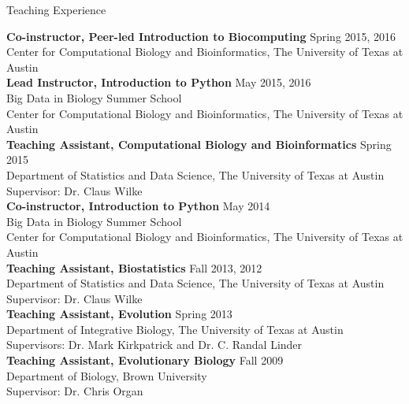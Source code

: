 \documentclass{resume} %
\begin{document}

\vspace*{0.5cm}
\begin{rSection}{Teaching Experience}
\vspace*{0.25cm}


\textbf{Co-instructor, Peer-led Introduction to Biocomputing} \hfill Spring 2015, 2016 \\ Center for Computational Biology and Bioinformatics, The University of Texas at Austin \\

\textbf{Lead Instructor, Introduction to Python} \hfill May 2015, 2016 \\ Big Data in Biology Summer School \\ Center for Computational Biology and Bioinformatics, The University of Texas at Austin \\

\textbf{Teaching Assistant, Computational Biology and Bioinformatics} \hfill Spring 2015 \\ Department of Statistics and Data Science, The University of Texas at Austin \\
Supervisor: Dr. Claus Wilke \\

\textbf{Co-instructor, Introduction to Python} \hfill May 2014 \\ Big Data in Biology Summer School \\ Center for Computational Biology and Bioinformatics, The University of Texas at Austin \\


\textbf{Teaching Assistant, Biostatistics} \hfill Fall 2013, 2012 \\ Department of Statistics and Data Science, The University of Texas at Austin \\
Supervisor: Dr. Claus Wilke \\

\textbf{Teaching Assistant, Evolution} \hfill Spring 2013 \\ Department of Integrative Biology, The University of Texas at Austin \\
Supervisors: Dr. Mark Kirkpatrick and Dr. C. Randal Linder \\

\textbf{Teaching Assistant, Evolutionary Biology} \hfill Fall 2009  \\ Department of Biology, Brown University \\
Supervisor: Dr. Chris Organ

\end{rSection}
\vspace*{0.5cm}
\end{document}
